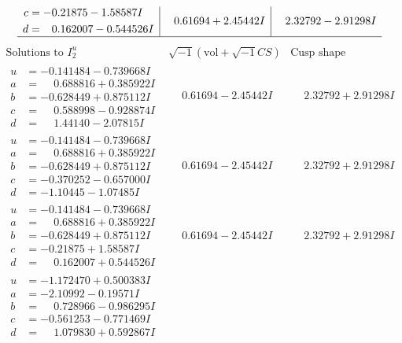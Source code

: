 \documentclass[1p]{elsarticle_modified}
\theoremstyle{definition}
\newcommand{\I}{\sqrt{-1}}
\begin{document}
$$\begin{array}{c|c|c}
\begin{aligned}
c &= -0.21875 - 1.58587 I \\
d &= \phantom{-}0.162007 - 0.544526 I\end{aligned}
 & \phantom{-}0.61694 + 2.45442 I & \phantom{-}2.32792 - 2.91298 I\\
 \hline 
 \end{array}$$\newpage$$\begin{array}{c|c|c}  
\text{Solutions to }I^u_{2}& \I (\text{vol} + \sqrt{-1}CS) & \text{Cusp shape}\\
 \hline 
\begin{aligned}
u &= -0.141484 - 0.739668 I \\
a &= \phantom{-}0.688816 + 0.385922 I \\
b &= -0.628449 + 0.875112 I \\
c &= \phantom{-}0.588998 - 0.928874 I \\
d &= \phantom{-}1.44140 - 2.07815 I\end{aligned}
 & \phantom{-}0.61694 - 2.45442 I & \phantom{-}2.32792 + 2.91298 I \\ \hline\begin{aligned}
u &= -0.141484 - 0.739668 I \\
a &= \phantom{-}0.688816 + 0.385922 I \\
b &= -0.628449 + 0.875112 I \\
c &= -0.370252 - 0.657000 I \\
d &= -1.10445 - 1.07485 I\end{aligned}
 & \phantom{-}0.61694 - 2.45442 I & \phantom{-}2.32792 + 2.91298 I \\ \hline\begin{aligned}
u &= -0.141484 - 0.739668 I \\
a &= \phantom{-}0.688816 + 0.385922 I \\
b &= -0.628449 + 0.875112 I \\
c &= -0.21875 + 1.58587 I \\
d &= \phantom{-}0.162007 + 0.544526 I\end{aligned}
 & \phantom{-}0.61694 - 2.45442 I & \phantom{-}2.32792 + 2.91298 I \\ \hline\begin{aligned}
u &= -1.172470 + 0.500383 I \\
a &= -2.10992 - 0.19571 I \\
b &= \phantom{-}0.728966 - 0.986295 I \\
c &= -0.561253 - 0.771469 I \\
d &= \phantom{-}1.079830 + 0.592867 I\end{aligned}

\end{array}$$
\end{document}
